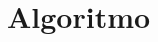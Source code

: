 \documentclass[conference]{IEEEtran}
\begin{document}

\section{Algoritmo}



% 


% 


% 


% 

\end{document}
